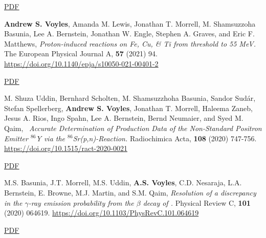\begin{bibsection}
\ifshort \vspace{0.1cm} \href{https://avoyles.github.io/papers/Fox2021_Nb.pdf}{\underline{PDF}} \else  \fi


\item \textbf{Andrew S. Voyles}, Amanda M. Lewis, Jonathan T. Morrell, M. Shamsuzzoha Basunia, Lee A. Bernstein, Jonathan W. Engle, Stephen A. Graves, and Eric F. Matthews, \emph{Proton-induced reactions on Fe, Cu, \& Ti from threshold to 55 MeV.} The European Physical Journal A, \textbf{57} (2021) 94. \url{https://doi.org/10.1140/epja/s10050-021-00401-2}

\ifshort \vspace{0.1cm} \href{https://avoyles.github.io/papers/Voyles2021_Fe_px.pdf}{\underline{PDF}} \else  \fi


\item M. Shuza Uddin, Bernhard Scholten, M. Shamsuzzhoha Basunia, Sandor Sudár, Stefan Spellerberg, \textbf{Andrew S. Voyles}, Jonathan T. Morrell, Haleema Zaneb, Jesus A. Rios, Ingo Spahn, Lee A. Bernstein, Bernd Neumaier, and Syed M. Qaim, \ \emph{Accurate Determination of Production Data of the Non-Standard Positron Emitter $^{86}$Y via the $^{86}$Sr(p,n)-Reaction.} Radiochimica Acta, \textbf{108} (2020) 747-756. \url{https://doi.org/10.1515/ract-2020-0021} 

\ifshort \vspace{0.1cm} \href{https://avoyles.github.io/papers/Uddin2020_86Y.pdf}{\underline{PDF}} \else  \fi 

\item M.S. Basunia, J.T. Morrell, M.S. Uddin, \textbf{A.S. Voyles}, C.D. Nesaraja, L.A. Bernstein, E. Browne, M.J. Martin, and S.M. Qaim, \emph{Resolution of a discrepancy in the $\gamma$-ray emission probability from the $\beta$ decay of .} Physical Review C, \textbf{101} (2020) 064619. \url{https://doi.org/10.1103/PhysRevC.101.064619} 

\ifshort \vspace{0.1cm} \href{https://avoyles.github.io/papers/Basunia2020_BR.pdf}{\underline{PDF}} \else  \fi 






\end{bibsection}
